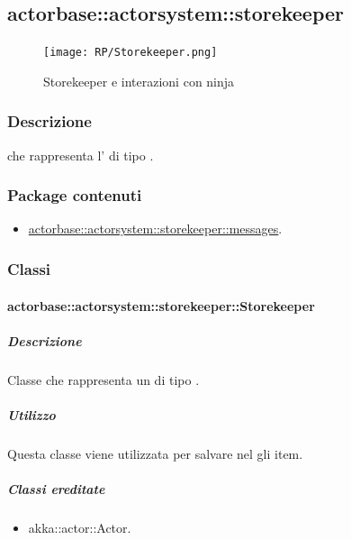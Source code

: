 \documentclass{scalatekids-article}
\begin{document}

\subsection{actorbase::actorsystem::storekeeper}
\label{sec:actorbase::actorsystem::storekeeper}

\begin{figure}[H]
  \begin{center}
    \texttt{[image: RP/Storekeeper.png]}
    \caption{Storekeeper e interazioni con ninja}
  \end{center}
\end{figure}

\subsubsection{Descrizione}
 che rappresenta l' di tipo .

\subsubsection{Package contenuti}
\begin{itemize}
\item \hyperref[sec:actorbase::actorsystem::storekeeper::messages]{actorbase::actorsystem::storekeeper::messages}.
\end{itemize}

\subsubsection{Classi}

\paragraph{actorbase::actorsystem::storekeeper::Storekeeper}
\label{sec:actorbase::actorsystem::storekeeper::Storekeeper}

\subparagraph{Descrizione}
Classe che rappresenta un  di tipo .

\subparagraph{Utilizzo}
Questa classe viene utilizzata per salvare nel  gli item.

\subparagraph{Classi ereditate}
\begin{itemize}
\item akka::actor::Actor.
\end{itemize}
\end{document}
